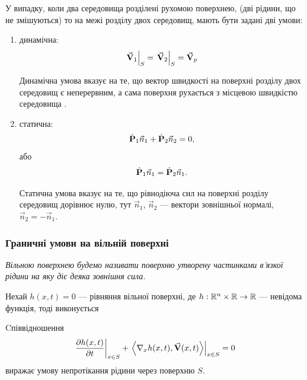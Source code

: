 У випадку, коли два середовища розділені рухомою поверхнею, (дві рідини, що не змішуються) то на межі розділу двох середовищ, мають бути задані дві умови:
\begin{enumerate}
 	\item динамічна:
 	\begin{equation}
 		\left. \vecf V_1 \right|_S = \left. \vecf V_2 \right|_S = \vecf V_p
 	\end{equation}

	\begin{remark}
		Динамічна умова вказує на те, що вектор швидкості на поверхні розділу двох середовищ є неперервним, а сама поверхня рухається з місцевою швидкістю середовища  . 
	\end{remark}

 	\item статична:
 	\begin{equation}
 		\dot{\bf{P}}_1 \vec n_1 + \dot{\bf{P}}_2 \vec n_2 = 0,
 	\end{equation}
 	або
 	\begin{equation}
 		\dot{\bf{P}}_1 \vec n_1 = \dot{\bf{P}}_2 \vec n_1.
 	\end{equation}

	\begin{remark}
		Статична умова вказує на те, що рівнодіюча сил на поверхні розділу середовищ дорівнює нулю, тут $\vec n_1$, $\vec n_2$ --- вектори зовнішньої нормалі, $\vec n_2 = - \vec n_1$.
	\end{remark}
\end{enumerate}

\subsubsection{Граничні умови на вільній поверхні}

\begin{definition}
	\it{Вільною поверхнею} будемо називати поверхню утворену частинками в'язкої рідини на яку діє деяка зовнішня сила.
\end{definition}

Нехай $h(x, t) = 0$ --- рівняння вільної поверхні, де $h: \RR^n\times \RR \to \RR$ --- невідома функція, тоді виконується
\begin{th_condition}[непротікання]
	Cпіввідношення 
	\begin{equation}
		\left. \frac{\partial h(x, t)}{\partial t} \right|_{x \in S} + \left. \langle \nabla_x h(x , t), \vecf V(x,t) \rangle \right|_{x \in S} = 0
	\end{equation}
	виражає умову непротікання рідини через поверхню $S$.
\end{th_condition}

